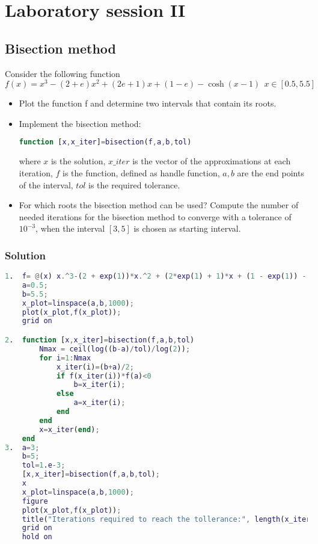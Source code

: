 \documentclass[12pt, a4paper]{report}
\begin{document}
\newpage

\chapter{Laboratory session II}
    \section{Bisection method}
        Consider the following function
        \[f(x) = x^3-(2+e)x^2+(2e+1)x+(1-e)-\cosh(x-1) \:\: x \in [0.5, 5.5]\]
        \begin{itemize}
            \item Plot the function f and determine two intervals that contain its roots.
            \item Implement the bisection method:
                \begin{lstlisting}[language=Matlab]
function [x,x_iter]=bisection(f,a,b,tol)
                \end{lstlisting}
                where $x$ is the solution, $x\_iter$ is the vector of the approximations at each iteration, $f$ is the function, defined as handle function, $a,b$ are the end points 
                of the interval, $tol$ is the required tolerance.
            \item For which roots the bisection method can be used? Compute the number of needed iterations for the bisection method to converge with a tolerance of $10^{-3}$, 
                when the interval $[3, 5]$ is chosen as starting interval.
        \end{itemize}
    \subsection*{Solution}
        \begin{lstlisting}[language=Matlab]
1.  f= @(x) x.^3-(2 + exp(1))*x.^2 + (2*exp(1) + 1)*x + (1 - exp(1)) - cosh(x - 1);
    a=0.5;
    b=5.5;
    x_plot=linspace(a,b,1000);
    plot(x_plot,f(x_plot));
    grid on

2.  function [x,x_iter]=bisection(f,a,b,tol)
        Nmax = ceil(log((b-a)/tol)/log(2));
        for i=1:Nmax
            x_iter(i)=(b+a)/2;
            if f(x_iter(i))*f(a)<0
                b=x_iter(i);
            else
                a=x_iter(i);
            end
        end
        x=x_iter(end);
    end
3.  a=3;
    b=5;
    tol=1.e-3;
    [x,x_iter]=bisection(f,a,b,tol);
    x
    x_plot=linspace(a,b,1000);
    figure
    plot(x_plot,f(x_plot));
    title("Iterations required to reach the tollerance:", length(x_iter))
    grid on
    hold on
        \end{lstlisting}  
\end{document}
